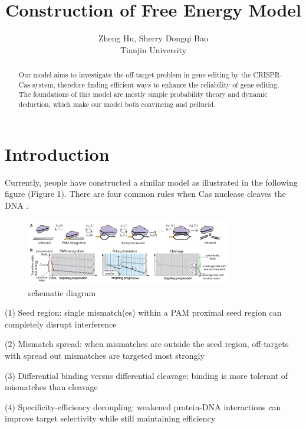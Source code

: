 \documentclass[a4paper,10pt]{article}
\title{Construction of Free Energy Model}
\author{Zheng Hu, Sherry Dongqi Bao \\ Tianjin University}
\begin{document}
	\maketitle
	
	\begin{abstract}
		Our model aims to investigate the off-target problem in gene editing by the CRISPR-Cas system, therefore finding efficient ways to enhance the reliability of gene editing. The foundations of this model are mostly simple probability theory and dynamic deduction, which make our model both convincing and pellucid.
	\end{abstract}
	
	
	\printbibliography
	\section{Introduction}
	Currently, people have constructed a similar model as illustrated in the following figure (Figure 1). There are four common rules when Cas nuclease cleaves the DNA \parencite{KLEIN20181413} 
	.
	\begin{figure}[tbph]
		\centering
		\includegraphics[width=3.5in]{1}
		\caption{schematic diagram}
		\label{fig:1}
	\end{figure}
	
	(1) Seed region: single mismatch(es) within a PAM proximal seed region can completely disrupt interference\par
	(2) Mismatch spread: when mismatches are outside the seed region, off-targets with spread out mismatches are targeted most strongly\par
	(3) Differential binding versus differential cleavage: binding is more tolerant of mismatches than cleavage\par 
	(4) Specificity-efficiency decoupling: weakened protein-DNA interactions can improve target selectivity while still maintaining efficiency\par
	
\end{document}
